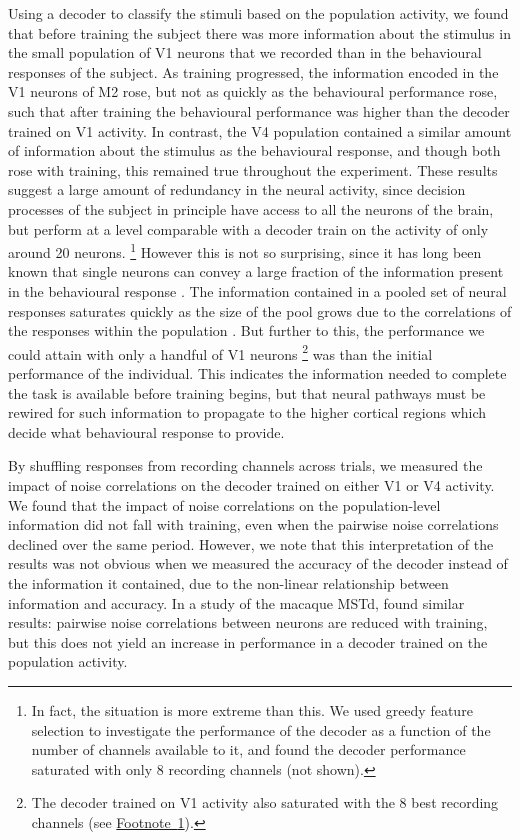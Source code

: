 Using a decoder to classify the stimuli based on the population activity, we found that before training the subject there was more information about the stimulus in the small population of \ac{V1} neurons that we recorded than in the behavioural responses of the subject.
As training progressed, the information encoded in the \ac{V1} neurons of \ac{M2} rose, but not as quickly as the behavioural performance rose, such that after training the behavioural performance was higher than the decoder trained on \ac{V1} activity.
In contrast, the \ac{V4} population contained a similar amount of information about the stimulus as the behavioural response, and though both rose with training, this remained true throughout the experiment.
These results suggest a large amount of redundancy in the neural activity, since decision processes of the subject in principle have access to all the neurons of the brain, but perform at a level comparable with a decoder train on the activity of only around \num{20} neurons.%
\footnote{%
\label{foot:pl_decoder_saturation}%
In fact, the situation is more extreme than this.
We used greedy feature selection to investigate the performance of the decoder as a function of the number of channels available to it, and found the decoder performance saturated with only \num{8} recording channels (not shown).
}
However this is not so surprising, since it has long been known that single neurons can convey a large fraction of the information present in the behavioural response \citep{Britten1992}.
The information contained in a pooled set of neural responses saturates quickly as the size of the pool grows due to the correlations of the responses within the population \citep{Zohary1994}.
But further to this, the performance we could attain with only a handful of \ac{V1} neurons%
\footnote{
The decoder trained on \ac{V1} activity also saturated with the \num{8} best recording channels (see \hyperref[foot:pl_decoder_saturation]{Footnote~\ref{foot:pl_decoder_saturation}}).
}
was  than the initial performance of the individual.
This indicates the information needed to complete the task is available before training begins, but that neural pathways  must be rewired for such information to propagate to the higher cortical regions which decide what behavioural response to provide.

By shuffling responses from recording channels across trials, we measured the impact of noise correlations on the decoder trained on either \ac{V1} or \ac{V4} activity.
We found that the impact of noise correlations on the population-level information did not fall with training, even when the pairwise noise correlations declined over the same period.
However, we note that this interpretation of the results was not obvious when we measured the accuracy of the decoder instead of the information it contained, due to the non-linear relationship between information and accuracy.
In a study of the macaque \ac{MSTd}, \citet{Gu2011} found similar results: pairwise noise correlations between neurons are reduced with training, but this does not yield an increase in performance in a decoder trained on the population activity.


